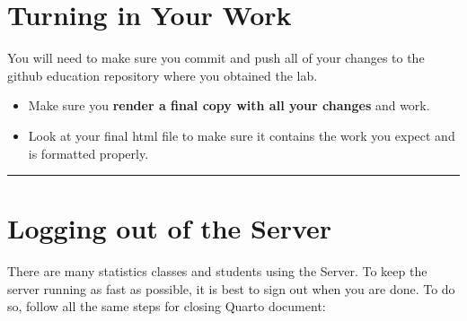 \documentclass[
  letterpaper,
  DIV=11,
  numbers=noendperiod]{scrartcl}
\providecommand{\tightlist}{%
  \setlength{\itemsep}{0pt}\setlength{\parskip}{0pt}}\usepackage{longtable,booktabs,array}
\begin{document}
\hypertarget{turning-in-your-work}{%
\section{Turning in Your Work}\label{turning-in-your-work}}

You will need to make sure you commit and push all of your changes to
the github education repository where you obtained the lab.

\begin{tcolorbox}[enhanced jigsaw, titlerule=0mm, toprule=.15mm, arc=.35mm, colbacktitle=quarto-callout-tip-color!10!white, coltitle=black, colframe=quarto-callout-tip-color-frame, left=2mm, breakable, bottomtitle=1mm, toptitle=1mm, bottomrule=.15mm, title=\textcolor{quarto-callout-tip-color}{\faLightbulb}\hspace{0.5em}{Tip}, colback=white, rightrule=.15mm, opacityback=0, opacitybacktitle=0.6, leftrule=.75mm]

\begin{itemize}
\tightlist
\item
  Make sure you \textbf{render a final copy with all your changes} and
  work.
\item
  Look at your final html file to make sure it contains the work you
  expect and is formatted properly.
\end{itemize}

\end{tcolorbox}

\begin{center}\rule{0.5\linewidth}{0.5pt}\end{center}

\hypertarget{logging-out-of-the-server}{%
\section{Logging out of the Server}\label{logging-out-of-the-server}}

There are many statistics classes and students using the Server. To keep
the server running as fast as possible, it is best to sign out when you
are done. To do so, follow all the same steps for closing Quarto
document:
\end{document}
